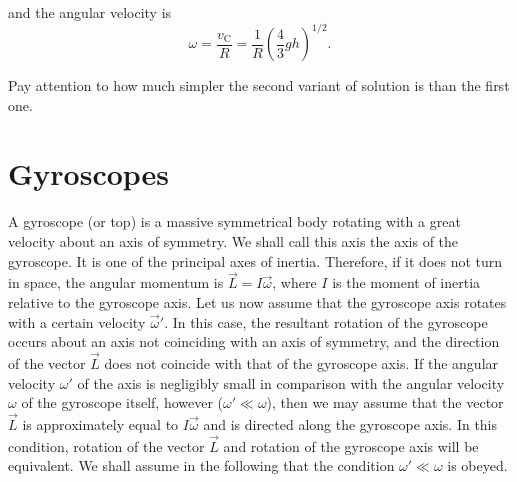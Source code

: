 \noindent
and the angular velocity is
\begin{equation*}
	\omega = \frac{v_{\text{C}}}{R} = \frac{1}{R} \left(\frac{4}{3}gh\right)^{1/2}.
\end{equation*}

Pay attention to how much simpler the second variant of solution is than the first one.

\section{Gyroscopes}\label{sec:5_9}

A gyroscope (or top) is a massive symmetrical body rotating with a great velocity about an axis of symmetry. We shall call this axis the axis of the gyroscope. It is one of the principal axes of inertia. Therefore, if it does not turn in space, the angular momentum is $\vec{L}=I\vec{\omega}$, where $I$ is the moment of inertia relative to the gyroscope axis. Let us now assume that the gyroscope axis rotates with a certain velocity $\vec{\omega}'$. In this case, the resultant rotation of the gyroscope occurs about an axis not coinciding with an axis of symmetry, and the direction of the vector $\vec{L}$ does not coincide with that of the gyroscope axis. If the angular velocity $\omega'$ of the axis is negligibly small in comparison with the angular velocity $\omega$ of the gyroscope itself, however ($\omega'\ll\omega$), then we may assume that the vector $\vec{L}$ is approximately equal to $I\vec{\omega}$ and is directed along the gyroscope axis. In this condition, rotation of the vector $\vec{L}$ and rotation of the gyroscope axis will be equivalent. We shall assume in the following that the condition $\omega'\ll\omega$ is obeyed.

